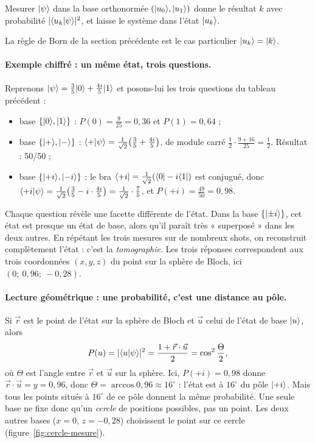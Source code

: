 \begin{definition}
Mesurer $\lvert \psi\rangle$ dans la base orthonormée $(\lvert u_0\rangle,\lvert u_1\rangle)$ donne le résultat $k$ avec probabilité $|\langle u_k\vert \psi\rangle|^2$, et laisse le système dans l'état $\lvert u_k\rangle$.
\end{definition}
La règle de Born de la section précédente est le cas particulier $\lvert u_k\rangle=\lvert k\rangle$.

\paragraph{Exemple chiffré : un même état, trois questions.} Reprenons $\lvert \psi\rangle=\tfrac35\lvert 0\rangle+\tfrac{4i}5\lvert 1\rangle$ et posons-lui les trois questions du tableau précédent :
\begin{itemize}
\item base $\{\lvert 0\rangle,\lvert 1\rangle\}$ : $P(0)=\tfrac9{25}=0{,}36$ et $P(1)=0{,}64$ ;
\item base $\{\lvert +\rangle,\lvert -\rangle\}$ : $\langle +\vert \psi\rangle=\tfrac1{\sqrt2}\big(\tfrac35+\tfrac{4i}5\big)$, de module carré $\tfrac12\cdot\tfrac{9+16}{25}=\tfrac12$. Résultat : 50/50 ;
\item base $\{\lvert +i\rangle,\lvert -i\rangle\}$ : le bra $\langle +i\rvert=\tfrac1{\sqrt2}(\langle 0\rvert-i\langle 1\rvert)$ est conjugué, donc $\langle +i\vert \psi\rangle=\tfrac1{\sqrt2}\big(\tfrac35-i\cdot\tfrac{4i}5\big)=\tfrac1{\sqrt2}\cdot\tfrac75$, et $P(+i)=\tfrac{49}{50}=0{,}98$.
\end{itemize}
Chaque question révèle une facette différente de l'état. Dans la base $\{\lvert \pm i\rangle\}$, cet état est presque un état de base, alors qu'il paraît très « superposé » dans les deux autres. En répétant les trois mesures sur de nombreux shots, on reconstruit complètement l'état : c'est la \emph{tomographie}. Les trois réponses correspondent aux trois coordonnées $(x,y,z)$ du point sur la sphère de Bloch, ici $(0;\ 0{,}96;\ -0{,}28)$.

\paragraph{Lecture géométrique : une probabilité, c'est une distance au pôle.} Si $\vec r$ est le point de l'état sur la sphère de Bloch et $\vec u$ celui de l'état de base $\lvert u\rangle$, alors
\[
P(u)=|\langle u\vert \psi\rangle|^2=\frac{1+\vec r\cdot\vec u}{2}=\cos^2\frac\Theta2,
\]
où $\Theta$ est l'angle entre $\vec r$ et $\vec u$ sur la sphère. Ici, $P(+i)=0{,}98$ donne $\vec r\cdot\vec u=y=0{,}96$, donc $\Theta=\arccos0{,}96\approx16^\circ$ : l'état est à $16^\circ$ du pôle $\lvert +i\rangle$. Mais tous les points situés à $16^\circ$ de ce pôle donnent la même probabilité. Une seule base ne fixe donc qu'un \emph{cercle} de positions possibles, pas un point. Les deux autres bases ($x=0$, $z=-0{,}28$) choisissent le point sur ce cercle (figure~\ref{fig:cercle-mesure}).

